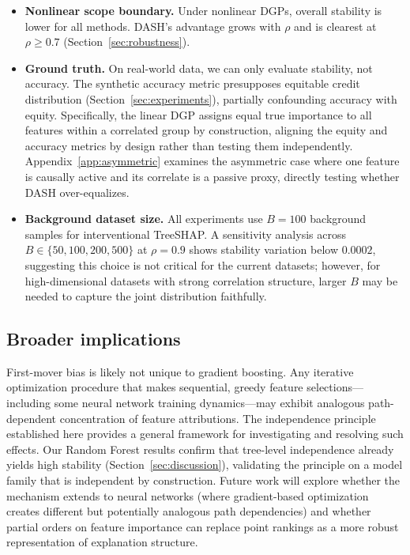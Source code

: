 \documentclass[10pt]{article}
\newcommand{\dash}{\textsc{DASH}}
\newcommand{\rhovar}{\rho}
\begin{document}
\begin{itemize}
    where diagonal entries are main effects and off-diagonal entries
    are pairwise interactions. Averaging these tensors element-wise
    across the ensemble would yield stable interaction estimates
    by the same independence argument. The computational cost is
    $O(TLD^2)$ per model (vs.\ $O(TLD)$ for standard SHAP), making
    this practical for moderate $P$ but expensive for large feature
    spaces.
  \item \textbf{Nonlinear scope boundary.} Under nonlinear DGPs,
    overall stability is lower for all methods. \dash{}'s advantage
    grows with $\rhovar$ and is clearest at $\rhovar \geq 0.7$
    (Section~\ref{sec:robustness}).
  \item \textbf{Ground truth.} On real-world data, we can only evaluate
    stability, not accuracy. The synthetic accuracy metric presupposes
    equitable credit distribution (Section~\ref{sec:experiments}),
    partially confounding accuracy with equity. Specifically, the
    linear DGP assigns equal true importance to all features within a
    correlated group by construction, aligning the equity and accuracy
    metrics by design rather than testing them independently.
    Appendix~\ref{app:asymmetric} examines the asymmetric case where
    one feature is causally active and its correlate is a passive proxy,
    directly testing whether \dash{} over-equalizes.
  \item \textbf{Background dataset size.} All experiments use $B = 100$
    background samples for interventional TreeSHAP. A sensitivity analysis
    across $B \in \{50, 100, 200, 500\}$ at $\rhovar = 0.9$ shows
    stability variation below $0.0002$, suggesting this choice is not
    critical for the current datasets; however, for high-dimensional
    datasets with strong correlation structure, larger $B$ may be needed
    to capture the joint distribution faithfully.
\end{itemize}

\subsection{Broader implications}

First-mover bias is likely not unique to gradient boosting. Any
iterative optimization procedure that makes sequential, greedy feature
selections---including some neural network training dynamics---may exhibit
analogous path-dependent concentration of feature attributions. The
independence principle established here provides a general framework for
investigating and resolving such effects. Our Random Forest results
confirm that tree-level independence already yields high stability
(Section~\ref{sec:discussion}), validating the principle on a model
family that is independent by construction. Future work will explore
whether the mechanism extends to neural networks (where gradient-based
optimization creates different but potentially analogous path
dependencies) and whether partial orders on feature importance can
replace point rankings as a more robust representation of explanation
structure.
\end{document}
